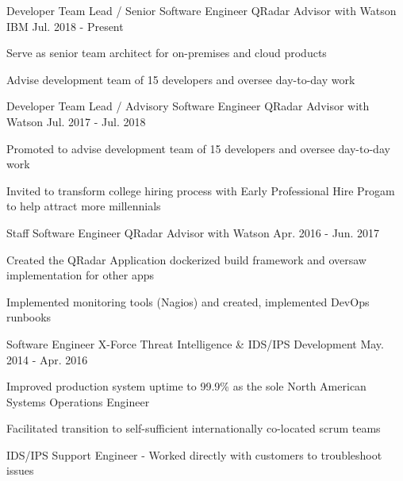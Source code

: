
\begin{cventries}

  \cventry
    {Developer Team Lead / Senior Software Engineer \enskip\textendash\enskip QRadar Advisor with Watson} %
    {IBM} %
    {} %
    {Jul. 2018 - Present} %
    {
      \begin{cvitems}
        \item {Serve as senior team architect for on-premises and cloud products}
        \item {Advise development team of 15 developers and oversee day-to-day work}
      \end{cvitems}
    }
    
  \cventry
    {Developer Team Lead / Advisory Software Engineer \enskip\textendash\enskip QRadar Advisor with Watson} %
    {} %
    {} %
    {Jul. 2017 - Jul. 2018} %
    {
      \begin{cvitems}
        \item {Promoted to advise development team of 15 developers and oversee day-to-day work}
        \item {Invited to transform college hiring process with Early Professional Hire Progam to help attract more millennials}
      \end{cvitems}
    }

  \cventry
    {Staff Software Engineer \enskip\textendash\enskip QRadar Advisor with Watson}
    {}
    {} %
    {Apr. 2016 - Jun. 2017}
    {
      \begin{cvitems}
        \item {Created the QRadar Application dockerized build framework and oversaw implementation for other apps}
        \item {Implemented monitoring tools (Nagios) and created, implemented DevOps runbooks}
      \end{cvitems}
    }
            
  \cventry
    {Software Engineer \enskip\textendash\enskip X-Force Threat Intelligence \& IDS/IPS Development}
    {}
    {} %
    {May. 2014 - Apr. 2016}
    {
    \begin{cvitems}
      \item {Improved production system uptime to 99.9\% as the sole North American Systems Operations Engineer}
      \item {Facilitated transition to self-sufficient internationally co-located scrum teams}
      \item {IDS/IPS Support Engineer - Worked directly with customers to troubleshoot issues}
    \end{cvitems}
    }


\end{cventries}
